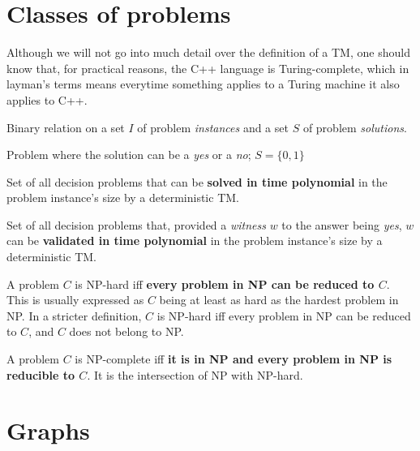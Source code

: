 \section{Classes of problems} \label{classes-problems}
Although we will not go into much detail over the definition of a \acrfull*{TM}, one should know that, for practical reasons, the C++ language is Turing-complete, which in layman's terms means everytime something applies to a Turing machine it also applies to C++.
\begin{definition}[Problem]
    Binary relation on a set $I$ of problem \emph{instances} and a set $S$ of problem \emph{solutions}.
\end{definition}
\begin{definition}
    Problem where the solution can be a \emph{yes} or a \emph{no}; $S=\{0,1\}$
\end{definition}
\begin{definition}[P]
    Set of all decision problems that can be \textbf{solved in time polynomial} in the problem instance's size by a deterministic \acrshort{TM}.
\end{definition}
\begin{definition}[NP]
    Set of all decision problems that, provided a \emph{witness} $w$ to the answer being \emph{yes}, $w$ can be \textbf{validated in time polynomial} in the problem instance's size by a deterministic \acrshort{TM}.
\end{definition}
\begin{definition}[NP-hard]
    A problem $C$ is NP-hard iff \textbf{every problem in NP can be reduced to $C$}. This is usually expressed as $C$ being at least as hard as the hardest problem in NP. In a stricter definition, $C$ is NP-hard iff every problem in NP can be reduced to $C$, and $C$ does not belong to NP.
\end{definition}
\begin{definition}[NP-complete]
    A problem $C$ is NP-complete iff \textbf{it is in NP and every problem in NP is reducible to $C$}. It is the intersection of NP with NP-hard.
\end{definition}

\section{Graphs} \label{graphs}
